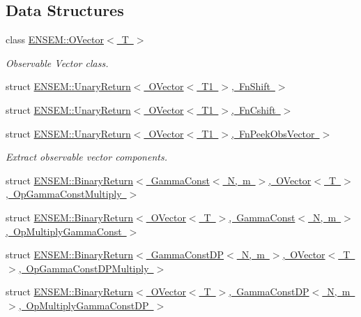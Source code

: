 \subsection*{Data Structures}
\begin{DoxyCompactItemize}
\item 
class \mbox{\hyperlink{classENSEM_1_1OVector}{E\+N\+S\+E\+M\+::\+O\+Vector$<$ T $>$}}
\begin{DoxyCompactList}\small\item\em Observable Vector class. \end{DoxyCompactList}\item 
struct \mbox{\hyperlink{structENSEM_1_1UnaryReturn_3_01OVector_3_01T1_01_4_00_01FnShift_01_4}{E\+N\+S\+E\+M\+::\+Unary\+Return$<$ O\+Vector$<$ T1 $>$, Fn\+Shift $>$}}
\item 
struct \mbox{\hyperlink{structENSEM_1_1UnaryReturn_3_01OVector_3_01T1_01_4_00_01FnCshift_01_4}{E\+N\+S\+E\+M\+::\+Unary\+Return$<$ O\+Vector$<$ T1 $>$, Fn\+Cshift $>$}}
\item 
struct \mbox{\hyperlink{structENSEM_1_1UnaryReturn_3_01OVector_3_01T1_01_4_00_01FnPeekObsVector_01_4}{E\+N\+S\+E\+M\+::\+Unary\+Return$<$ O\+Vector$<$ T1 $>$, Fn\+Peek\+Obs\+Vector $>$}}
\begin{DoxyCompactList}\small\item\em Extract observable vector components. \end{DoxyCompactList}\item 
struct \mbox{\hyperlink{structENSEM_1_1BinaryReturn_3_01GammaConst_3_01N_00_01m_01_4_00_01OVector_3_01T_01_4_00_01OpGammaConstMultiply_01_4}{E\+N\+S\+E\+M\+::\+Binary\+Return$<$ Gamma\+Const$<$ N, m $>$, O\+Vector$<$ T $>$, Op\+Gamma\+Const\+Multiply $>$}}
\item 
struct \mbox{\hyperlink{structENSEM_1_1BinaryReturn_3_01OVector_3_01T_01_4_00_01GammaConst_3_01N_00_01m_01_4_00_01OpMultiplyGammaConst_01_4}{E\+N\+S\+E\+M\+::\+Binary\+Return$<$ O\+Vector$<$ T $>$, Gamma\+Const$<$ N, m $>$, Op\+Multiply\+Gamma\+Const $>$}}
\item 
struct \mbox{\hyperlink{structENSEM_1_1BinaryReturn_3_01GammaConstDP_3_01N_00_01m_01_4_00_01OVector_3_01T_01_4_00_01OpGammaConstDPMultiply_01_4}{E\+N\+S\+E\+M\+::\+Binary\+Return$<$ Gamma\+Const\+D\+P$<$ N, m $>$, O\+Vector$<$ T $>$, Op\+Gamma\+Const\+D\+P\+Multiply $>$}}
\item 
struct \mbox{\hyperlink{structENSEM_1_1BinaryReturn_3_01OVector_3_01T_01_4_00_01GammaConstDP_3_01N_00_01m_01_4_00_01OpMultiplyGammaConstDP_01_4}{E\+N\+S\+E\+M\+::\+Binary\+Return$<$ O\+Vector$<$ T $>$, Gamma\+Const\+D\+P$<$ N, m $>$, Op\+Multiply\+Gamma\+Const\+D\+P $>$}}

\end{DoxyCompactItemize}
